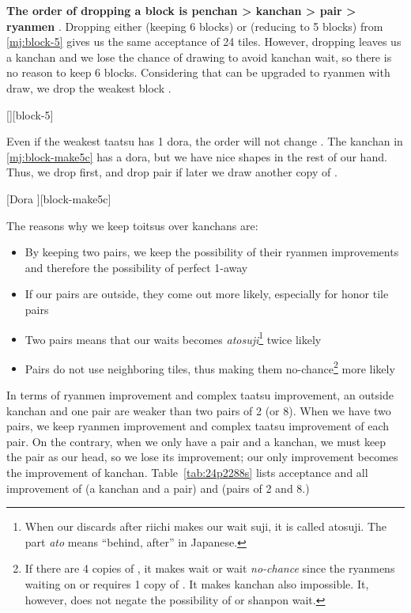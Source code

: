 \documentclass[12pt]{article}
\newlength\stdbls %
\newcommand{\mjfn}[1]{\raisebox{-.135\stdbls}{\mahjong[0.75\stdbls]{#1}}}
\begin{document}
\textbf{The order of dropping a block is penchan \textgreater{} kanchan \textgreater{} pair \textgreater{} ryanmen} \citep[][pp. 21--22]{ishibashi-black}. Dropping either  (keeping 6 blocks) or  (reducing to 5 blocks) from \ref{mj:block-5} gives us the same acceptance of 24 tiles. However, dropping  leaves us a kanchan and we lose the chance of drawing  to avoid kanchan wait, so there is no reason to keep 6 blocks. Considering that  can be upgraded to ryanmen with  draw, we drop the weakest block .

[][block-5]

Even if the weakest taatsu has 1 dora, the order will not change \citep{yuusee-5block}. The  kanchan in \ref{mj:block-make5c} has a dora, but we have nice shapes in the rest of our hand. Thus, we drop  first, and drop  pair if later we draw another copy of .

[Dora ][block-make5c]

The reasons why we keep toitsus over kanchans  are:

\begin{itemize}
\item By keeping two pairs, we keep the possibility of their ryanmen improvements and therefore the possibility of perfect 1-away
\item If our pairs are outside, they come out more likely, especially for honor tile pairs
\item Two pairs means that our waits becomes \textit{atosuji}\footnote{When our discards after riichi makes our wait suji, it is called atosuji. The part \textit{ato} means ``behind, after'' in Japanese.} twice likely
\item Pairs do not use neighboring tiles, thus making them no-chance\footnote{If there are 4 copies of \mjfn{3p}, it makes \mjfn{1p} wait or \mjfn{2p} wait \textit{no-chance} since the ryanmens waiting on \mjfn{1p} or \mjfn{2p} requires 1 copy of \mjfn{3p}. It makes \mjfn{13p} kanchan also impossible. It, however, does not negate the possibility of \mjfn{11p} or \mjfn{22p} shanpon wait.} more likely
\end{itemize}

In terms of ryanmen improvement and complex taatsu improvement, an outside kanchan and one pair are weaker than two pairs of 2 (or 8). When we have two pairs, we keep ryanmen improvement and complex taatsu improvement of each pair. On the contrary, when we only have a pair and a kanchan, we must keep the pair as our head, so we lose its improvement; our only improvement becomes the improvement of kanchan. Table~\ref{tab:24p2288s} lists acceptance and all improvement of  (a kanchan and a pair) and  (pairs of 2 and 8.)
\end{document}
